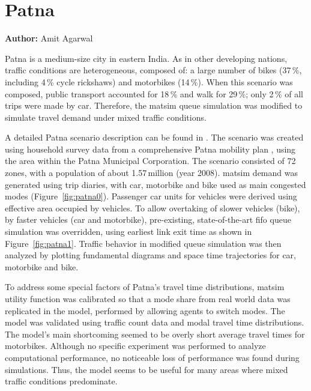 \section{Patna}
\label{sec:patna}
\hfill \textbf{Author:} Amit Agarwal

Patna is a medium-size city in eastern India. As in other developing nations, traffic conditions are heterogeneous, composed of: a large number of bikes (37\,\%, including 4\,\% cycle rickshaws) and motorbikes (14\,\%). When this scenario was composed, public transport accounted for 18\,\% and walk for 29\,\%; only 2\,\% of all trips were made by car. Therefore, the \gls{matsim} queue simulation was modified to simulate travel demand under mixed traffic conditions.

A detailed Patna scenario description can be found in \citet[][]{AgarwalEtcMixedTraffic}. The scenario was created using household survey data from a comprehensive Patna mobility plan \citep[][]{TrippItransVks2009PatnaReport}, using the area within the Patna Municipal Corporation. The scenario consisted of 72\,zones, with a population of about 1.57\,million (year 2008). \gls{matsim} demand was generated using trip diaries, with car, motorbike and bike used as main congested modes (Figure~\ref{fig:patna0}). Passenger car units for vehicles were derived using effective area occupied by vehicles. 
To allow overtaking of slower vehicles (bike), by faster vehicles (car and motorbike), pre-existing, state-of-the-art \gls{fifo} queue simulation was overridden, using earliest link exit time as shown in Figure~\ref{fig:patna1}. Traffic behavior in modified queue simulation was then analyzed by plotting fundamental diagrams and space time trajectories for car, motorbike and bike.

To address some special factors of Patna's travel time distributions, \gls{matsim} utility function was calibrated so that a mode share from real world data was replicated in the model, performed by allowing agents to switch modes. The model was validated using traffic count data and modal travel time distributions. The model's main shortcoming seemed to be overly short average travel times for motorbikes. Although no specific experiment was performed to analyze computational performance, no noticeable loss of performance was found during simulations. Thus, the model seems to be useful for many areas where mixed traffic conditions predominate.

